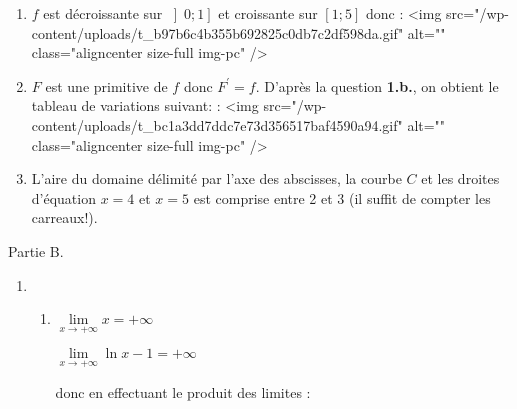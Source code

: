 \begin{corrige}
\begin{enumerate}
\begin{enumerate}
\begin{center}
\begin{extern}
{
      }
   \end{extern}
\end{center}
\item
               $f$ est décroissante sur $\left]0; 1\right]$ et croissante sur $\left[1;5\right]$ donc :
               <img src="/wp-content/uploads/t_b97b6c4b355b692825c0db7c2df598da.gif" alt="" class="aligncenter size-full  img-pc" />
               \item
               $F$ est une primitive de $f$ donc $F^{\prime}=f$. D'après la question \textbf{1.b.}, on obtient le tableau de variations suivant: :
               <img src="/wp-content/uploads/t_bc1a3dd7ddc7e73d356517baf4590a94.gif" alt="" class="aligncenter size-full  img-pc" />
               \item
               L'aire du domaine délimité par l'axe des abscisses, la courbe $C$ et les droites d'équation $x=4$ et $x=5$ est comprise entre 2 et 3 (il suffit de compter les carreaux!).
          \end{enumerate}
     \end{enumerate}
     \begin{h3}Partie B.\end{h3}
     \begin{enumerate}
          \item
          \begin{enumerate}[label=\alph*.]
               \item
               $\lim\limits_{x\rightarrow +\infty }x=+\infty $
               \par
               $\lim\limits_{x\rightarrow +\infty }\ln x-1=+\infty $
               \par
               donc en effectuant le produit des limites :
               \par

\end{enumerate}
\end{enumerate}
\end{corrige}

